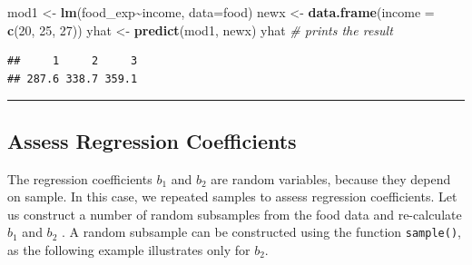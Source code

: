 \documentclass[
]{book}
\newenvironment{Shaded}{\begin{snugshade}}{\end{snugshade}}
\newcommand{\AttributeTok}[1]{\textcolor[rgb]{0.13,0.29,0.53}{#1}}
\newcommand{\CommentTok}[1]{\textcolor[rgb]{0.56,0.35,0.01}{\textit{#1}}}
\newcommand{\DecValTok}[1]{\textcolor[rgb]{0.00,0.00,0.81}{#1}}
\newcommand{\FunctionTok}[1]{\textcolor[rgb]{0.13,0.29,0.53}{\textbf{#1}}}
\newcommand{\NormalTok}[1]{#1}
\newcommand{\OtherTok}[1]{\textcolor[rgb]{0.56,0.35,0.01}{#1}}
\newcommand{\SpecialCharTok}[1]{\textcolor[rgb]{0.81,0.36,0.00}{\textbf{#1}}}
\begin{document}
\begin{Shaded}
\begin{Highlighting}[]
\NormalTok{mod1 }\OtherTok{\textless{}{-}} \FunctionTok{lm}\NormalTok{(food\_exp}\SpecialCharTok{\textasciitilde{}}\NormalTok{income, }\AttributeTok{data=}\NormalTok{food)}
\NormalTok{newx }\OtherTok{\textless{}{-}} \FunctionTok{data.frame}\NormalTok{(}\AttributeTok{income =} \FunctionTok{c}\NormalTok{(}\DecValTok{20}\NormalTok{, }\DecValTok{25}\NormalTok{, }\DecValTok{27}\NormalTok{))}
\NormalTok{yhat }\OtherTok{\textless{}{-}} \FunctionTok{predict}\NormalTok{(mod1, newx)}
\NormalTok{yhat                                                 }\CommentTok{\# prints the result}
\end{Highlighting}
\end{Shaded}

\begin{verbatim}
##     1     2     3 
## 287.6 338.7 359.1
\end{verbatim}

\begin{center}\rule{0.5\linewidth}{0.5pt}\end{center}

\hypertarget{assess-regression-coefficients}{%
\subsection{Assess Regression Coefficients}\label{assess-regression-coefficients}}

The regression coefficients \(b_1\) and \(b_2\) are random variables, because they depend on sample. In this case, we repeated samples to assess regression coefficients. Let us construct a number of random subsamples from the food data and re-calculate \(b_1\) and \(b_2\) . A random subsample can be constructed using the function \texttt{sample()}, as the following example illustrates only for \(b_2\).
\end{document}
